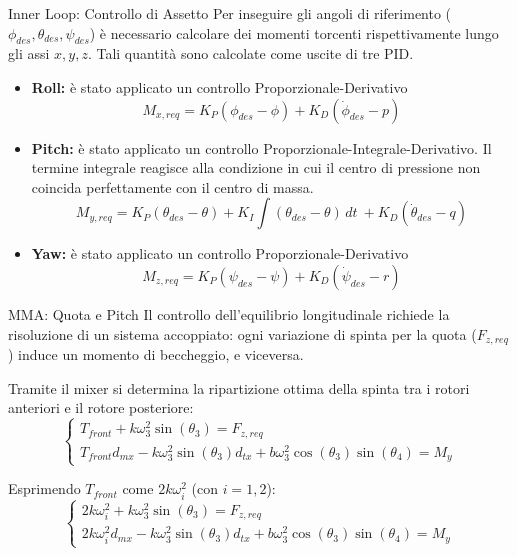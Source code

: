 \documentclass[aspectratio=169]{beamer} %
\begin{document}
\begin{frame}{Inner Loop: Controllo di Assetto}
Per inseguire gli angoli di riferimento ($\phi_{des}, \theta_{des}, \psi_{des}$) è necessario calcolare dei momenti torcenti rispettivamente lungo gli assi $x, y, z$.
Tali quantità sono calcolate come uscite di tre PID.
\begin{itemize}
    \item \textbf{Roll:} è stato applicato un controllo Proporzionale-Derivativo
    \begin{equation}
        M_{x,req} = K_P (\phi_{des} - \phi) + K_D (\dot{\phi}_{des} - p)
    \end{equation}
    \item \textbf{Pitch:} è stato applicato un controllo Proporzionale-Integrale-Derivativo. Il termine integrale reagisce alla condizione in cui il centro di pressione non coincida perfettamente con il centro di massa.
    \begin{equation}
        M_{y,req} = K_P (\theta_{des} - \theta) + K_I \int (\theta_{des} - \theta) \,dt\ + K_D (\dot{\theta}_{des} - q)
    \end{equation}
    \item \textbf{Yaw:} è stato applicato un controllo Proporzionale-Derivativo
    \begin{equation}
        M_{z,req} = K_P (\psi_{des} - \psi) + K_D (\dot{\psi}_{des} - r)
    \end{equation}
\end{itemize}
\end{frame}

\begin{frame}{MMA: Quota e Pitch}
    Il controllo dell'equilibrio longitudinale richiede la risoluzione di un sistema accoppiato: ogni variazione di spinta per la quota ($F_{z,req}$) induce un momento di beccheggio, e viceversa.
    
    \vspace{0.2cm}
    Tramite il mixer si determina la ripartizione ottima della spinta tra i rotori anteriori e il rotore posteriore:
    \begin{equation}
        \begin{cases}
        T_{front} + k \omega_{3}^2 \sin(\theta_{3}) = F_{z,req} \\
        T_{front} d_{mx} - k \omega_{3}^2 \sin(\theta_{3}) d_{tx} + b \omega_{3}^2 \cos(\theta_{3}) \sin(\theta_{4}) = M_y
        \end{cases}
    \end{equation}
    
    \vspace{0.2cm}
    Esprimendo $T_{front}$ come $2 k \omega_{i}^2$ (con $i=1,2$):
    \begin{equation}
        \begin{cases}
        2 k \omega_{i}^2 + k \omega_{3}^2 \sin(\theta_3) = F_{z,req} \\
        2 k \omega_{i}^2 d_{mx} - k \omega_{3}^2 \sin(\theta_3) d_{tx} + b \omega_{3}^2 \cos(\theta_{3}) \sin(\theta_{4}) = M_{y}
        \end{cases}
    \end{equation}
\end{frame}
\end{document}
